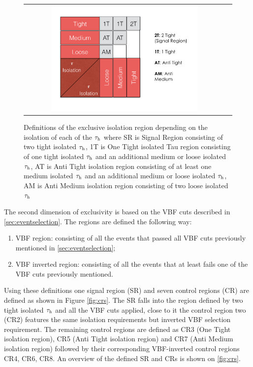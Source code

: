  	\begin{figure}[tbh!]
 		\centering
 		\begin{tabular}{cc}
 			\includegraphics[width=0.75\textwidth]{PLOTS/diTauHadLSotherPlots/tauisoregions.png}
 		\end{tabular}
 		\caption{Definitions of the exclusive isolation region depending on the isolation of each of the $\tau_{\text{h}}$ where SR is Signal Region consisting of two tight isolated $\tau_{\text{h}}$, 1T is One Tight isolated Tau region consisting of one tight isolated $\tau_{\text{h}}$ and an additional medium or loose isolated $\tau_{\text{h}}$, AT is Anti Tight isolation region consisting of at least one medium isolated $\tau_{\text{h}}$ and an additional medium or loose isolated $\tau_{\text{h}}$,  AM is Anti Medium isolation region consisting of two loose isolated $\tau_{\text{h}}$}
 		\label{fig:tauisoregions}
 	\end{figure}
 
The second dimension of exclusivity is based on the VBF cuts described in \ref{sec:eventselection}. The regions are defined the following way:
	
	\begin{enumerate}
		\item VBF region: consisting of all the events that passed all VBF cuts previously mentioned in \autoref{sec:eventselection};
		\item VBF inverted region: consisting of all the events that at least fails one of the VBF cuts previously mentioned.
	\end{enumerate} 

Using these definitions one signal region (SR) and seven control regions (CR) are defined as shown in Figure \ref{fig:crs}. The SR falls into the region defined by two tight isolated $\tau_{\text{h}}$ and all the VBF cuts applied, close to it the control region two (CR2) features the same \hadtau isolation requirements but inverted VBF selection requirement. The remaining control regions are defined as CR3 (One Tight isolation region), CR5  (Anti Tight isolation region) and CR7 (Anti Medium isolation region) followed by their corresponding VBF-inverted control regions CR4, CR6, CR8. An overview of the defined SR and CRs is shown on \autoref{fig:crs}.


